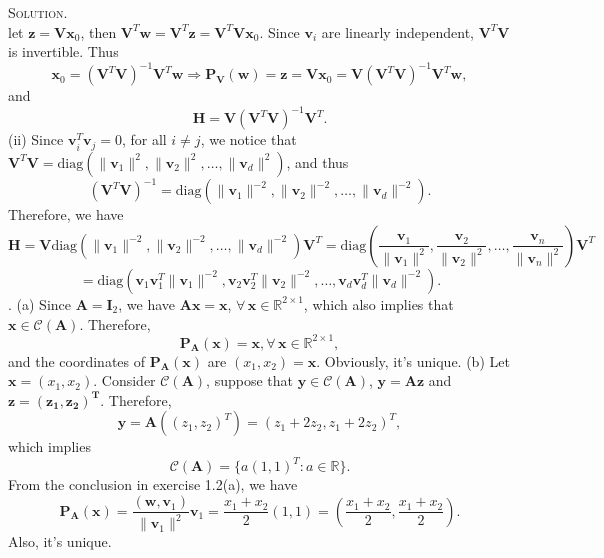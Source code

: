 \documentclass[12pt, a4paper, oneside]{ctexart}
\newenvironment{solution}{\par\noindent\textsc{Solution. }}{\\\par}
\newcommand{\proj}[2]{\textbf{P}_{#2} (#1)}
\begin{document}
\begin{solution}
\[    \]
    let $\mathbf{z} = \mathbf{V} \mathbf{x}_0$, then $\mathbf{V}^T \mathbf{w} = \mathbf{V}^T \mathbf{z} = \mathbf{V}^T \mathbf{V} \mathbf{x}_0$. Since $\mathbf{v}_i$ are linearly independent, $\mathbf{V}^T \mathbf{V}$ is invertible. Thus
    \[
    \mathbf{x}_0 = (\mathbf{V}^T \mathbf{V})^{-1} \mathbf{V}^T \mathbf{w} \Rightarrow \proj{\mathbf{w}}{\mathbf{V}} = \mathbf{z} = \mathbf{V} \mathbf{x}_0 = \mathbf{V} (\mathbf{V}^T \mathbf{V})^{-1} \mathbf{V}^T \mathbf{w},
    \]
    and
    \[
    \mathbf{H} = \mathbf{V} (\mathbf{V}^T \mathbf{V})^{-1} \mathbf{V}^T.
    \]
    \newline\newline
    (ii) Since $\mathbf{v}_i^T \mathbf{v}_j = 0$, for all $i \neq j$, we notice that $\mathbf{V}^T \mathbf{V} = \text{diag}(\|\mathbf{v}_1\|^2, \|\mathbf{v}_2\|^2, \dots, \|\mathbf{v}_d\|^2)$, and thus 
    \[
    (\mathbf{V}^T \mathbf{V})^{-1} = \text{diag}(\|\mathbf{v}_1\|^{-2}, \|\mathbf{v}_2\|^{-2}, \dots, \|\mathbf{v}_d\|^{-2}).
    \]
    Therefore, we have
    \[
    \mathbf{H} = \mathbf{V} \text{diag}(\|\mathbf{v}_1\|^{-2}, \|\mathbf{v}_2\|^{-2}, \dots, \|\mathbf{v}_d\|^{-2}) \mathbf{V}^T = \text{diag}\left( \frac{\mathbf{v}_1}{\|\mathbf{v}_1\|^2}, \frac{\mathbf{v}_2}{\|\mathbf{v}_2\|^2}, \dots, \frac{\mathbf{v}_n}{\|\mathbf{v}_n\|^2} \right) \mathbf{V}^T
    \]
    \[
    = \text{diag}(\mathbf{v}_1 \mathbf{v}_1^T \|\mathbf{v}_1\|^{-2}, \mathbf{v}_2 \mathbf{v}_2^T \|\mathbf{v}_2\|^{-2}, \dots, \mathbf{v}_d \mathbf{v}_d^T \|\mathbf{v}_d\|^{-2}).
    \]
    \newline{}. (a) Since $\mathbf{A} = \mathbf{I}_{2}$, we have $\mathbf{Ax} = \mathbf{x}$, $\forall\, \mathbf{x} \in \mathbb{R}^{2 \times 1}$, which also implies that $\mathbf{x} \in \mathcal{C}(\mathbf{A})$. Therefore, 
    \[
    \proj{\mathbf{x}}{\mathbf{A}} = \mathbf{x}, \forall\, \mathbf{x} \in \mathbb{R}^{2 \times 1},
    \]
    and the coordinates of $\proj{\mathbf{x}}{\mathbf{A}}$ are $(x_{1}, x_{2}) = \mathbf{x}$. Obviously, it's unique.
    \newline\newline
    (b) Let $\mathbf{x} = (x_{1}, x_{2})$. Consider $\mathcal{C}(\mathbf{A})$, suppose that $\mathbf{y} \in \mathcal{C}(\mathbf{A})$, $\mathbf{y} = \mathbf{Az}$ and $\mathbf{z = (z_{1}, z_{2})^{T}}$. Therefore, 
    \[
    \mathbf{y} = \mathbf{A}((z_{1}, z_{2})^{T}) = (z_{1} + 2z_{2}, z_{1} + 2z_{2})^{T},
    \]
    which implies 
    \[
    \mathcal{C}(\mathbf{A}) = \{a(1, 1)^{T}: a \in \mathbb{R}\}.
    \]
    From the conclusion in exercise 1.2(a), we have
    \[
    \proj{\mathbf{x}}{\mathbf{A}} = \frac{(\mathbf{w}, \mathbf{v}_{1})}{\|\mathbf{v}_{1}\|^{2}}\mathbf{v}_{1} = \frac{x_{1} + x_{2}}{2}(1, 1) = \left( \frac{x_{1} + x_{2}}{2}, \frac{x_{1} + x_{2}}{2} \right).
    \]
    Also, it's unique.
\end{solution}
	
\end{document}
